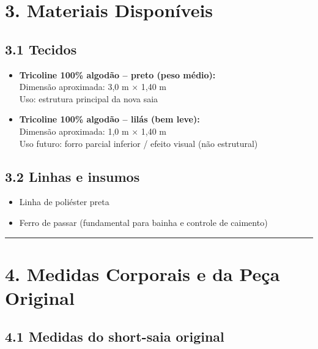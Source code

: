 \documentclass[
  10pt,oneside]{article}
\providecommand{\tightlist}{%
  \setlength{\itemsep}{0pt}\setlength{\parskip}{0pt}}
\begin{document}
\section{3. Materiais Disponíveis}\label{materiais-disponuxedveis}

\subsection{3.1 Tecidos}\label{tecidos}

\begin{itemize}
\item
  \textbf{Tricoline 100\% algodão -- preto (peso médio):}\\
  Dimensão aproximada: 3,0 m × 1,40 m\\
  Uso: estrutura principal da nova saia
\item
  \textbf{Tricoline 100\% algodão -- lilás (bem leve):}\\
  Dimensão aproximada: 1,0 m × 1,40 m\\
  Uso futuro: forro parcial inferior / efeito visual (não estrutural)
\end{itemize}

\subsection{3.2 Linhas e insumos}\label{linhas-e-insumos}

\begin{itemize}
\tightlist
\item
  Linha de poliéster preta
\item
  Ferro de passar (fundamental para bainha e controle de caimento)
\end{itemize}

\begin{center}\rule{0.5\linewidth}{0.5pt}\end{center}

\section{4. Medidas Corporais e da Peça Original}\label{medidas-corporais-e-da-peuxe7a-original}

\subsection{4.1 Medidas do short-saia original}\label{medidas-do-short-saia-original}
\end{document}
